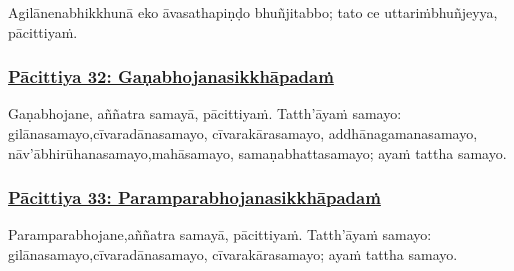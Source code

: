 Agilānena\makeatletter\hyperlink{endnote280-appendix}\makeatother \thinspace bhikkhunā eko āvasathapiṇḍo bhuñjitabbo; tato ce uttariṁ\makeatletter\hyperlink{endnote281-appendix}\makeatother \thinspace bhuñjeyya, pācittiyaṁ.



\subsubsection*{\hyperref[exp32]{Pācittiya 32: Gaṇabhojanasikkhāpadaṁ}}
\label{pac32}

Gaṇabhojane, aññatra samayā, pācittiyaṁ. Tatth'āyaṁ samayo: gilānasamayo,\makeatletter\hyperlink{endnote282-appendix}\makeatother \thinspace cīvaradānasamayo, cīvarakārasamayo, addhānagamanasamayo, nāv'ābhirūhanasamayo,\makeatletter\hyperlink{endnote283-appendix}\makeatother \thinspace mahāsamayo, samaṇabhattasamayo; ayaṁ tattha samayo.



\subsubsection*{\hyperref[exp33]{Pācittiya 33: Paramparabhojanasikkhāpadaṁ}}
\label{pac33}

Paramparabhojane,\makeatletter\hyperlink{endnote284-appendix}\makeatother \thinspace aññatra samayā, pācittiyaṁ. Tatth'āyaṁ samayo: gilānasamayo,\makeatletter\hyperlink{endnote285-appendix}\makeatother \thinspace cīvaradānasamayo, cīvarakārasamayo; ayaṁ tattha samayo.



